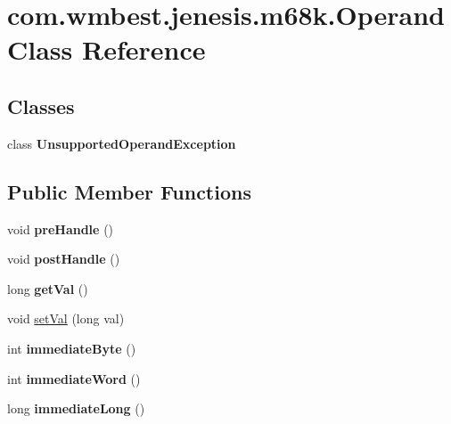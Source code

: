 \hypertarget{classcom_1_1wmbest_1_1jenesis_1_1m68k_1_1Operand}{\section{com.\-wmbest.\-jenesis.\-m68k.\-Operand Class Reference}
\label{classcom_1_1wmbest_1_1jenesis_1_1m68k_1_1Operand}
}
\subsection*{Classes}
\begin{DoxyCompactItemize}
\item 
class {\bfseries Unsupported\-Operand\-Exception}
\end{DoxyCompactItemize}
\subsection*{Public Member Functions}
\begin{DoxyCompactItemize}
\item 
\hypertarget{classcom_1_1wmbest_1_1jenesis_1_1m68k_1_1Operand_a285ab3caa88f6610f6195e95a3f1883d}{void {\bfseries pre\-Handle} ()}\label{classcom_1_1wmbest_1_1jenesis_1_1m68k_1_1Operand_a285ab3caa88f6610f6195e95a3f1883d}

\item 
\hypertarget{classcom_1_1wmbest_1_1jenesis_1_1m68k_1_1Operand_af361d2a9715cff0bca4d337c84edfb73}{void {\bfseries post\-Handle} ()}\label{classcom_1_1wmbest_1_1jenesis_1_1m68k_1_1Operand_af361d2a9715cff0bca4d337c84edfb73}

\item 
\hypertarget{classcom_1_1wmbest_1_1jenesis_1_1m68k_1_1Operand_a9e2d1bb6f551ab8575f7b372055f5d6a}{long {\bfseries get\-Val} ()}\label{classcom_1_1wmbest_1_1jenesis_1_1m68k_1_1Operand_a9e2d1bb6f551ab8575f7b372055f5d6a}

\item 
void \hyperlink{classcom_1_1wmbest_1_1jenesis_1_1m68k_1_1Operand_a0216c18d36ae0ec59bd4e9b79294856f}{set\-Val} (long val)
\item 
\hypertarget{classcom_1_1wmbest_1_1jenesis_1_1m68k_1_1Operand_a6016e1d1e0fe49aa60f11079f9c9c843}{int {\bfseries immediate\-Byte} ()}\label{classcom_1_1wmbest_1_1jenesis_1_1m68k_1_1Operand_a6016e1d1e0fe49aa60f11079f9c9c843}

\item 
\hypertarget{classcom_1_1wmbest_1_1jenesis_1_1m68k_1_1Operand_aea77952ab2c06574d3db19a0576d26b6}{int {\bfseries immediate\-Word} ()}\label{classcom_1_1wmbest_1_1jenesis_1_1m68k_1_1Operand_aea77952ab2c06574d3db19a0576d26b6}

\item 
\hypertarget{classcom_1_1wmbest_1_1jenesis_1_1m68k_1_1Operand_ae9aebb863d2e7408e894d7bca065912b}{long {\bfseries immediate\-Long} ()}\label{classcom_1_1wmbest_1_1jenesis_1_1m68k_1_1Operand_ae9aebb863d2e7408e894d7bca065912b}

\end{DoxyCompactItemize}
